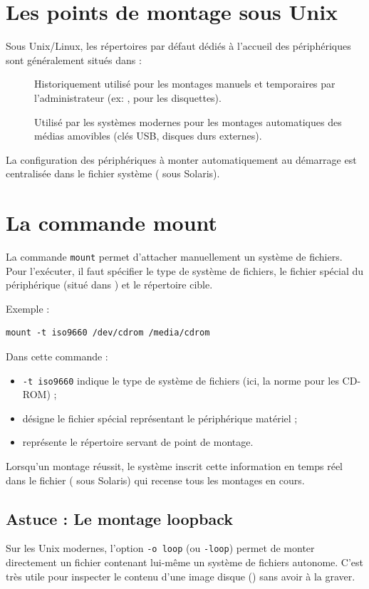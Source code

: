 \section{Les points de montage sous Unix}
Sous Unix/Linux, les répertoires par défaut dédiés à l'accueil des périphériques sont généralement situés dans :
\begin{description}
    \item[] Historiquement utilisé pour les montages manuels et temporaires par l'administrateur (ex: ,  pour les disquettes).
    \item[] Utilisé par les systèmes modernes pour les montages automatiques des médias amovibles (clés USB, disques durs externes).
\end{description}

La configuration des périphériques à monter automatiquement au démarrage est centralisée dans le fichier système  ( sous Solaris).


\section{La commande mount}
La commande \texttt{mount} permet d'attacher manuellement un système de fichiers. Pour l'exécuter, il faut spécifier le type de système de fichiers, le fichier spécial du périphérique (situé dans ) et le répertoire cible.

Exemple :
\begin{verbatim}
mount -t iso9660 /dev/cdrom /media/cdrom
\end{verbatim}

Dans cette commande :
\begin{itemize}[label=$\bullet$]
    \item \texttt{-t iso9660} indique le type de système de fichiers (ici, la norme pour les CD-ROM) ;
    \item {} désigne le fichier spécial représentant le périphérique matériel ;
    \item {} représente le répertoire servant de point de montage.
\end{itemize}

Lorsqu'un montage réussit, le système inscrit cette information en temps réel dans le fichier  ( sous Solaris) qui recense tous les montages en cours.

\subsection{Astuce : Le montage loopback}
Sur les Unix modernes, l'option \texttt{-o loop} (ou \texttt{-loop}) permet de monter directement un fichier contenant lui-même un système de fichiers autonome. C'est très utile pour inspecter le contenu d'une image disque () sans avoir à la graver.


